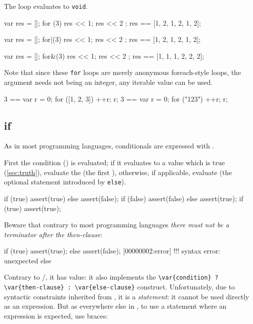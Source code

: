 
The loop evaluates to \lstinline|void|.

\begin{urbiassert}
{ var res = []; for (3) { res << 1; res << 2 } ; res }
        == [1, 2, 1, 2, 1, 2];

{ var res = []; for|(3) { res << 1; res << 2 } ; res }
        == [1, 2, 1, 2, 1, 2];

{ var res = []; for&(3) { res << 1; res << 2 } ; res }
        == [1, 1, 1, 2, 2, 2];
\end{urbiassert}

Note that since these \lstinline|for| loops are merely anonymous
foreach-style loops, the argument needs not being an integer, any iterable
value can be used.

\begin{urbiassert}
3 == { var r = 0; for ([1, 2, 3]) ++r; r};
3 == { var r = 0; for ("123")     ++r; r};
\end{urbiassert}


\subsection{if}
\label{sec:lang:if}
As in most programming languages, conditionals are expressed with
.


First the condition () is evaluated; if it evaluates to a
value which is true (\autoref{sec:truth}), evaluate the 
(the first ), otherwise, if applicable, evaluate
 (the optional statement introduced by \lstinline|else|).

\begin{urbiscript}
if (true) assert(true) else assert(false);
if (false) assert(false) else assert(true);
if (true) assert(true);
\end{urbiscript}

Beware that contrary to most programming languages \emph{there must not be a
  terminator after the then-clause}:

\begin{urbiscript}
if (true)
  assert(true);
else
  assert(false);
[00000002:error] !!! syntax error: unexpected else
\end{urbiscript}

Contrary to \langC/\Cxx, it has value: it also implements the
\lstinline|\var{condition} ? \var{then-clause} : \var{else-clause}|
construct.  Unfortunately, due to syntactic constraints inherited from \langC,
it is a \emph{statement}: it cannot be used directly as an expression.  But
as everywhere else in \us, to use a statement where an expression is
expected, use braces:

